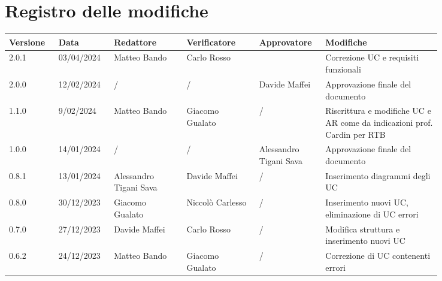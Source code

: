 \section*{Registro delle modifiche}


 {
  \renewcommand{\arraystretch}{1.5}
  \scriptsize
  \begin{longtable}{p{0.10\linewidth}p{0.10\linewidth}p{0.15\linewidth}p{0.15\linewidth}p{0.10\linewidth}p{0.24\linewidth}}
	  \textbf{Versione} & \textbf{Data} & \textbf{Redattore}     & \textbf{Verificatore}  & \textbf{Approvatore}   & \textbf{Modifiche}                                                       \\
	  \hline
	  2.0.1             & 03/04/2024    & Matteo Bando           & Carlo Rosso            &           			   & Correzione UC e requisiti funzionali                                        \\ 
	  \hline
	  2.0.0             & 12/02/2024    & /                      & /                      & Davide Maffei          & Approvazione finale del documento                                        \\
	  \hline
	  1.1.0             & 9/02/2024     & Matteo Bando           & Giacomo Gualato        & /                      & Riscrittura e modifiche UC e AR come da indicazioni prof. Cardin per RTB \\
	  \hline
	  1.0.0             & 14/01/2024    & /                      & /                      & Alessandro Tigani Sava & Approvazione finale del documento                                        \\
	  \hline
	  0.8.1             & 13/01/2024    & Alessandro Tigani Sava & Davide Maffei          & /                      & Inserimento diagrammi degli UC                                           \\
	  \hline
	  0.8.0             & 30/12/2023    & Giacomo Gualato        & Niccolò Carlesso       & /                      & Inserimento nuovi UC, eliminazione di UC errori                          \\
	  \hline
	  0.7.0             & 27/12/2023    & Davide Maffei          & Carlo Rosso            & /                      & Modifica struttura e inserimento nuovi UC                                \\
	  \hline
	  0.6.2             & 24/12/2023    & Matteo Bando           & Giacomo Gualato        & /                      & Correzione di UC contenenti errori                                       \\

\end{longtable}}
